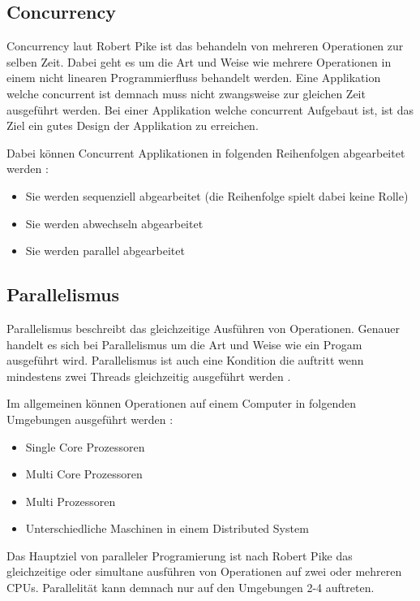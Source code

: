 \subsection{Concurrency}
\label{section:concurrency}

Concurrency laut Robert Pike ist das behandeln von mehreren Operationen zur selben Zeit. Dabei geht es um die Art und Weise wie mehrere Operationen in einem nicht linearen Programmierfluss behandelt werden. Eine Applikation welche concurrent ist demnach muss nicht zwangsweise zur gleichen Zeit ausgeführt werden. Bei einer Applikation welche concurrent Aufgebaut ist, ist das Ziel ein gutes Design der Applikation zu erreichen. \cite[]{Pik2013}

Dabei können Concurrent Applikationen in folgenden Reihenfolgen abgearbeitet werden \cite[p. 14]{Erb2012}:

\begin{itemize}
  \item Sie werden sequenziell abgearbeitet (die Reihenfolge spielt dabei keine Rolle)
  \item Sie werden abwechseln abgearbeitet
  \item Sie werden parallel abgearbeitet
\end{itemize}

\subsection{Parallelismus}
Parallelismus beschreibt das gleichzeitige Ausführen von Operationen. Genauer handelt es sich bei Parallelismus um die Art und Weise wie ein Progam ausgeführt wird. Parallelismus ist auch eine Kondition die auftritt wenn mindestens zwei Threads gleichzeitig ausgeführt werden \cite[]{oracle:multithreading}.

Im allgemeinen können Operationen auf einem Computer in folgenden Umgebungen ausgeführt werden \cite[p. 14]{Erb2012}:

\begin{itemize}
  \item Single Core Prozessoren
  \item Multi Core Prozessoren
  \item Multi Prozessoren
  \item Unterschiedliche Maschinen in einem Distributed System
\end{itemize}

Das Hauptziel von paralleler Programierung ist nach Robert Pike das gleichzeitige oder simultane ausführen von Operationen auf zwei oder mehreren CPUs.\cite[]{Pik2013} Parallelität kann demnach nur auf den Umgebungen 2-4 auftreten. 
 

